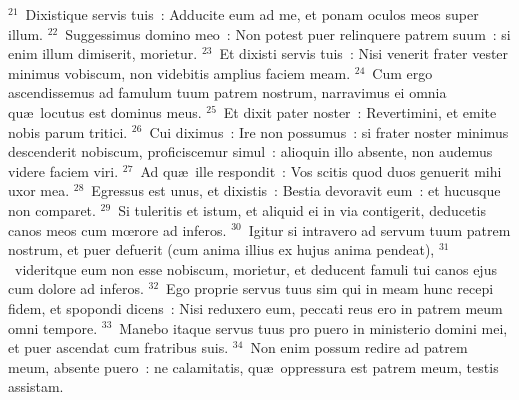 ${}^{21}$~Dixistique servis tuis~: Adducite eum ad me, et ponam oculos meos super illum.
${}^{22}$~Suggessimus domino meo~: Non potest puer relinquere patrem suum~: si enim illum dimiserit, morietur.
${}^{23}$~Et dixisti servis tuis~: Nisi venerit frater vester minimus vobiscum, non videbitis amplius faciem meam.
${}^{24}$~Cum ergo ascendissemus ad famulum tuum patrem nostrum, narravimus ei omnia qu\ae\ locutus est dominus meus.
${}^{25}$~Et dixit pater noster~: Revertimini, et emite nobis parum tritici.
${}^{26}$~Cui diximus~: Ire non possumus~: si frater noster minimus descenderit nobiscum, proficiscemur simul~: alioquin illo absente, non audemus videre faciem viri.
${}^{27}$~Ad qu\ae\ ille respondit~: Vos scitis quod duos genuerit mihi uxor mea.
${}^{28}$~Egressus est unus, et dixistis~: Bestia devoravit eum~: et hucusque non comparet.
${}^{29}$~Si tuleritis et istum, et aliquid ei in via contigerit, deducetis canos meos cum mœrore ad inferos.
${}^{30}$~Igitur si intravero ad servum tuum patrem nostrum, et puer defuerit (cum anima illius ex hujus anima pendeat),
${}^{31}$~videritque eum non esse nobiscum, morietur, et deducent famuli tui canos ejus cum dolore ad inferos.
${}^{32}$~Ego proprie servus tuus sim qui in meam hunc recepi fidem, et spopondi dicens~: Nisi reduxero eum, peccati reus ero in patrem meum omni tempore.
${}^{33}$~Manebo itaque servus tuus pro puero in ministerio domini mei, et puer ascendat cum fratribus suis.
${}^{34}$~Non enim possum redire ad patrem meum, absente puero~: ne calamitatis, qu\ae\ oppressura est patrem meum, testis assistam.

